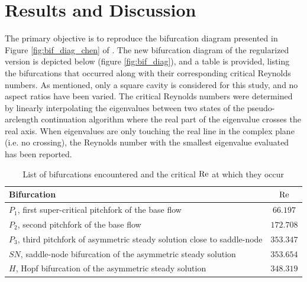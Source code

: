 
\section{Results and Discussion} \label{sec:resdisc}

The primary objective is to reproduce the bifurcation diagram presented in
Figure \ref{fig:bif_diag_chen} of \citet{chen2013}. The new bifurcation diagram
of the regularized version is depicted below (figure \ref{fig:bif_diag}), and a
table is provided, listing the bifurcations that occurred along with their
corresponding critical Reynolds numbers. As mentioned, only a square cavity is
considered for this study, and no aspect ratios have been varied. The critical
Reynolds numbers were determined by linearly interpolating the eigenvalues
between two states of the pseudo-arclength continuation algorithm where the
real part of the eigenvalue crosses the real axis. When eigenvalues are only
touching the real line in the complex plane (i.e. no crossing), the Reynolds
number with the smallest eigenvalue evaluated has been reported.

\begin{table}[h!]
  \centering
  \caption{List of bifurcations encountered and the critical $\mathrm{Re}$ at which they
    occur}
  \label{tab:bif_points}
\begin{tabular}{l c}
Bifurcation & $\mathrm{Re}$\\
\hline
$P_1$, first super-critical pitchfork of the base flow & $66.197$ \\
$P_2$, second pitchfork of the base flow & $172.708$ \\
$P_3$, third pitchfork of asymmetric steady solution close to saddle-node & $353.347$ \\
$SN$, saddle-node bifurcation of the asymmetric steady solution & $353.654$ \\
$H$, Hopf bifurcation of the asymmetric steady solution & $348.319$ \\
\end{tabular}
\end{table}

